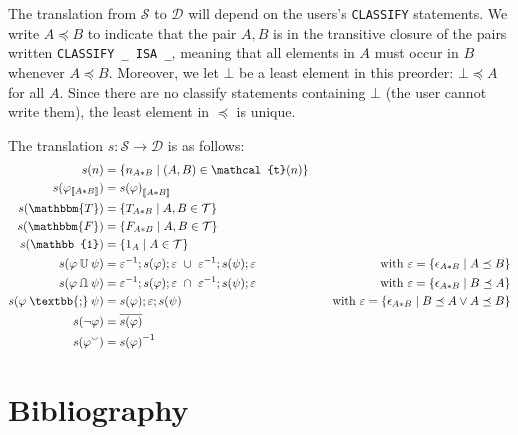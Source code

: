 \documentclass[12pt]{article}
\newcommand{\typesemi}{\mathbin{\text{\textbb{;}}}}
\newcommand{\typeunion}{\mathbin{\mathbb{U}}}
\newcommand{\typeinter}{\mathbin{\text{\rotatebox[origin=c]{180}{$\typeunion$}}}}
\newcommand{\typevee}{\mathbbm{T}}
\newcommand{\typenil}{\mathbbm{F}}
\newcommand{\typecomp}[1]{\neg{#1}}
\newcommand{\typeconv}[1]{{#1}^\smallsmile}
\newcommand{\typeident}{\mathbb{1}}
\newcommand{\typetyped}[2]{{#1}_{\llbracket #2 \rrbracket}}
\newcommand{\conv}[1]{{#1}^{-1}}
\begin{document}
The translation from $\mathcal{S}$ to $\mathcal{D}$ will depend on the users's \verb=CLASSIFY= statements.
We write $A\preceq B$ to indicate that the pair $A,B$ is in the transitive closure of the pairs written \verb=CLASSIFY _ ISA _=, meaning that all elements in $A$ must occur in $B$ whenever $A\preceq B$.
Moreover, we let $\bot$ be a least element in this preorder: $\bot \preceq A$ for all $A$.
Since there are no classify statements containing $\bot$ (the user cannot write them), the least element in $\preceq$ is unique.

The translation $s : \mathcal{S} \to \mathcal{D}$ is as follows:
\begin{align*}
s(n) &= \{n_{A*B} \mid (A,B)\in\mathcal{t}(n)\}\\
s(\typetyped{\varphi}{A*B}) &= \typetyped{s(\varphi)}{A*B}\\
s(\typevee) &= \{T_{A*B} \mid A,B\in\mathcal{T}\}\\
s(\typenil) &= \{F_{A*B} \mid A,B\in\mathcal{T}\}\\
s(\typeident) &= \{1_{A} \mid A\in\mathcal{T}\}\\
s(\varphi \typeunion \psi) &= \conv{\varepsilon};s(\varphi);\varepsilon\ \cup\ \conv{\varepsilon};s(\psi);\varepsilon&\quad\text{with $\varepsilon = \{\epsilon_{A*B} \mid A\preceq B \}$} \\
s(\varphi \typeinter \psi) &= \conv{\varepsilon};s(\varphi);\varepsilon\ \cap\ \conv{\varepsilon};s(\psi);\varepsilon&\quad\text{with $\varepsilon = \{\epsilon_{A*B} \mid B\preceq A \}$}\\
s(\varphi \typesemi \psi) &= s(\varphi);\varepsilon;s(\psi)&\quad\text{with $\varepsilon = \{\epsilon_{A*B} \mid B\preceq A \vee A\preceq B \}$}\\
s(\typecomp{\varphi}) &= \overline{s(\varphi)}\\
s(\typeconv{\varphi}) &= \conv{s(\varphi)}
\end{align*}

\section{Bibliography}



\end{document}

